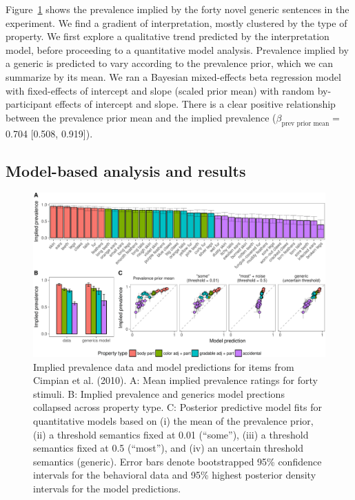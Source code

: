 \documentclass[floatsintext,doc]{apa6}
\theoremstyle{definition}
\theoremstyle{definition}
\theoremstyle{definition}
\theoremstyle{remark}
\begin{document}
Figure~\ref{fig:cimpian-modelingResults} shows the prevalence implied by
the forty novel generic sentences in the experiment. We find a gradient
of interpretation, mostly clustered by the type of property. We first
explore a qualitative trend predicted by the interpretation model,
before proceeding to a quantitative model analysis. Prevalence implied
by a generic is predicted to vary according to the prevalence prior,
which we can summarize by its mean. We ran a Bayesian mixed-effects beta
regression model with fixed-effects of intercept and slope (scaled prior
mean) with random by-participant effects of intercept and slope. There
is a clear positive relationship between the prevalence prior mean and
the implied prevalence (\(\beta_{\text{prev prior mean}}=\) 0.704
{[}0.508, 0.919{]}).

\subsection{Model-based analysis and
results}\label{model-based-analysis-and-results}

\begin{figure}
\centering
\includegraphics{genint_files/figure-latex/cimpian-modelingResults-1.pdf}
\caption{\label{fig:cimpian-modelingResults}Implied prevalence data and
model predictions for items from Cimpian et al. (2010). A: Mean implied
prevalence ratings for forty stimuli. B: Implied prevalence and generics
model prections collapsed across property type. C: Posterior predictive
model fits for quantitative models based on (i) the mean of the
prevalence prior, (ii) a threshold semantics fixed at 0.01
(\enquote{some}), (iii) a threshold semantics fixed at 0.5
(\enquote{most}), and (iv) an uncertain threshold semantics (generic).
Error bars denote bootstrapped 95\% confidence intervals for the
behavioral data and 95\% highest posterior density intervals for the
model predictions.}
\end{figure}
\end{document}
